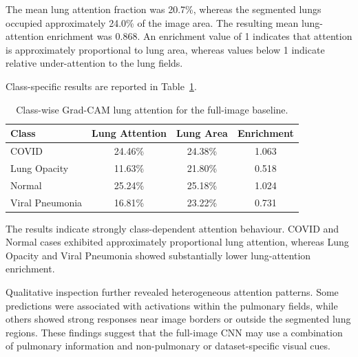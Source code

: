 The mean lung attention fraction was 20.7\%, whereas the segmented lungs
occupied approximately 24.0\% of the image area. The resulting mean
lung-attention enrichment was 0.868. An enrichment value of 1 indicates that
attention is approximately proportional to lung area, whereas values below 1
indicate relative under-attention to the lung fields.

Class-specific results are reported in
Table~\ref{tab:full_gradcam_attention}.

\begin{table}[H]
\centering
\caption{Class-wise Grad-CAM lung attention for the full-image baseline.}
\label{tab:full_gradcam_attention}
\begin{tabular}{lccc}
\toprule
\textbf{Class} &
\textbf{Lung Attention} &
\textbf{Lung Area} &
\textbf{Enrichment} \\
\midrule
COVID            & 24.46\% & 24.38\% & 1.063 \\
Lung Opacity     & 11.63\% & 21.80\% & 0.518 \\
Normal           & 25.24\% & 25.18\% & 1.024 \\
Viral Pneumonia  & 16.81\% & 23.22\% & 0.731 \\
\bottomrule
\end{tabular}
\end{table}

The results indicate strongly class-dependent attention behaviour. COVID and
Normal cases exhibited approximately proportional lung attention, whereas
Lung Opacity and Viral Pneumonia showed substantially lower lung-attention
enrichment.

Qualitative inspection further revealed heterogeneous attention patterns.
Some predictions were associated with activations within the pulmonary fields,
while others showed strong responses near image borders or outside the
segmented lung regions. These findings suggest that the full-image CNN may use
a combination of pulmonary information and non-pulmonary or dataset-specific
visual cues.



